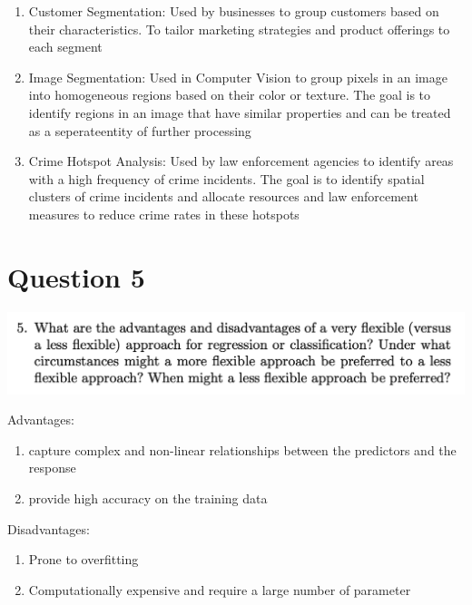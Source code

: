 \documentclass[
]{article}
\providecommand{\tightlist}{%
  \setlength{\itemsep}{0pt}\setlength{\parskip}{0pt}}
\begin{document}
\begin{enumerate}
\def\labelenumi{\arabic{enumi}.}
\tightlist
\item
  Customer Segmentation: Used by businesses to group customers based on
  their characteristics. To tailor marketing strategies and product
  offerings to each segment
\item
  Image Segmentation: Used in Computer Vision to group pixels in an
  image into homogeneous regions based on their color or texture. The
  goal is to identify regions in an image that have similar properties
  and can be treated as a seperateentity of further processing
\item
  Crime Hotspot Analysis: Used by law enforcement agencies to identify
  areas with a high frequency of crime incidents. The goal is to
  identify spatial clusters of crime incidents and allocate resources
  and law enforcement measures to reduce crime rates in these hotspots
\end{enumerate}

\hypertarget{question-5}{%
\section{Question 5}\label{question-5}}

\includegraphics{images/image-44460808.png}

Advantages:

\begin{enumerate}
\def\labelenumi{\arabic{enumi}.}
\tightlist
\item
  capture complex and non-linear relationships between the predictors
  and the response
\item
  provide high accuracy on the training data
\end{enumerate}

Disadvantages:

\begin{enumerate}
\def\labelenumi{\arabic{enumi}.}
\tightlist
\item
  Prone to overfitting
\item
  Computationally expensive and require a large number of parameter
\end{enumerate}
\end{document}
